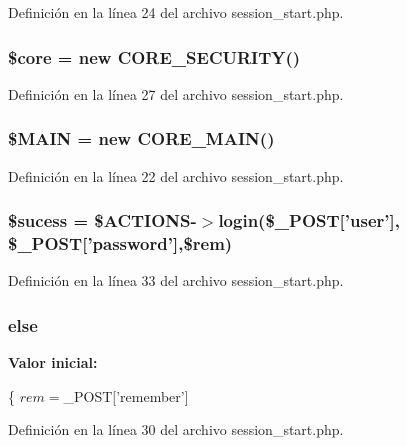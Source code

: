 Definición en la línea 24 del archivo session\-\_\-start.\-php.

\hypertarget{session__start_8php_aa432de3bacb7ced3632fa0ee0269ada3}{
\subsubsection[{\$core}]{\setlength{\rightskip}{0pt plus 5cm}\$core = new {\bf C\-O\-R\-E\-\_\-\-S\-E\-C\-U\-R\-I\-T\-Y}()}}\label{session__start_8php_aa432de3bacb7ced3632fa0ee0269ada3}


Definición en la línea 27 del archivo session\-\_\-start.\-php.

\hypertarget{session__start_8php_aa3efd4a61925b50d9d066bd2b42dcd3d}{
\subsubsection[{\$\-M\-A\-I\-N}]{\setlength{\rightskip}{0pt plus 5cm}\$M\-A\-I\-N = new {\bf C\-O\-R\-E\-\_\-\-M\-A\-I\-N}()}}\label{session__start_8php_aa3efd4a61925b50d9d066bd2b42dcd3d}


Definición en la línea 22 del archivo session\-\_\-start.\-php.

\hypertarget{session__start_8php_a86449a889635e869cc5aa1014aaf61fb}{
\subsubsection[{\$sucess}]{\setlength{\rightskip}{0pt plus 5cm}\$sucess = \$A\-C\-T\-I\-O\-N\-S-\/$>$login(\$\-\_\-\-P\-O\-S\-T\mbox{[}'user'\mbox{]}, \$\-\_\-\-P\-O\-S\-T\mbox{[}'password'\mbox{]},\$rem)}}\label{session__start_8php_a86449a889635e869cc5aa1014aaf61fb}


Definición en la línea 33 del archivo session\-\_\-start.\-php.

\hypertarget{session__start_8php_a0544c3fe466e421738dae463968b70ba}{
\subsubsection[{else}]{\setlength{\rightskip}{0pt plus 5cm}else}}\label{session__start_8php_a0544c3fe466e421738dae463968b70ba}
{\bfseries Valor inicial\-:}
\begin{DoxyCode}
\{
                $rem=$\_POST[\textcolor{stringliteral}{'remember'}]
\end{DoxyCode}


Definición en la línea 30 del archivo session\-\_\-start.\-php.

